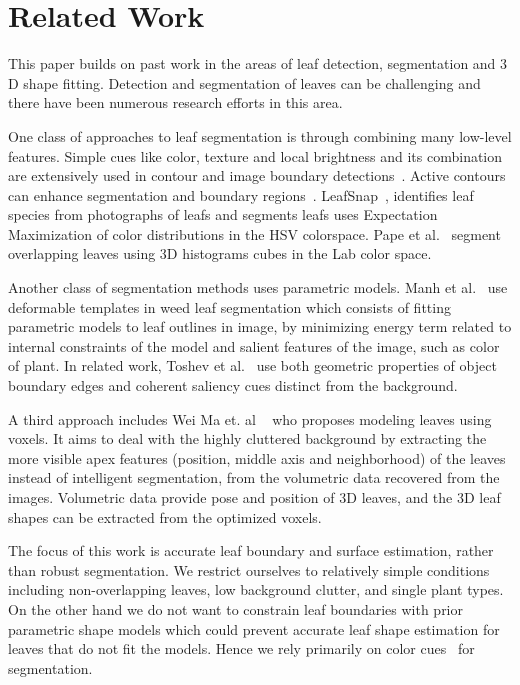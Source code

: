 \section{Related Work}
\label{sec:related}


This paper builds on past work in the areas of leaf detection, segmentation and $3$D shape fitting.   Detection and segmentation of leaves can be challenging and there have been numerous research efforts in this area.

One class of approaches to leaf segmentation is through combining many low-level features.  Simple cues like color, texture and local brightness and its combination are extensively used in contour and image boundary detections~\cite{martin2004learning,valliammal2012leaf}.  Active contours can enhance segmentation and boundary regions~\cite{mishra2011decoupled}. LeafSnap~\cite{kumar2012leafsnap}, identifies leaf species from photographs of leafs and segments leafs uses Expectation Maximization of color distributions in the HSV colorspace.  Pape et al.~\cite{Pape2015} segment overlapping leaves using 3D histograms cubes in the Lab color space.

Another class of segmentation methods uses parametric models.  Manh et al.~\cite{Manh2001139} use deformable templates in weed leaf segmentation which consists of fitting parametric models to leaf outlines in image, by minimizing energy term related to internal constraints of the model and salient features of the image, such as color of plant. In related work, Toshev et al.~\cite{toshev2012shape} use both geometric properties of object boundary edges and coherent saliency cues distinct from the background.

A third approach includes Wei Ma et. al ~\cite{ma2008image} who proposes modeling leaves using voxels. It aims to deal with the highly cluttered background by extracting the more visible apex features (position, middle axis and neighborhood) of the leaves instead of intelligent segmentation, from the volumetric data recovered from the images.  Volumetric data provide pose and position of $3$D leaves, and the $3$D leaf shapes can be extracted from the optimized voxels.

The focus of this work is accurate leaf boundary and surface estimation, rather than robust segmentation.  We restrict ourselves to relatively simple conditions including non-overlapping leaves, low background clutter, and single plant types.    On the other hand we do not want to constrain leaf boundaries with prior parametric shape models which could prevent accurate leaf shape estimation for leaves that do not fit the models. Hence we rely primarily on color cues~\cite{achanta2012slic} for segmentation.

